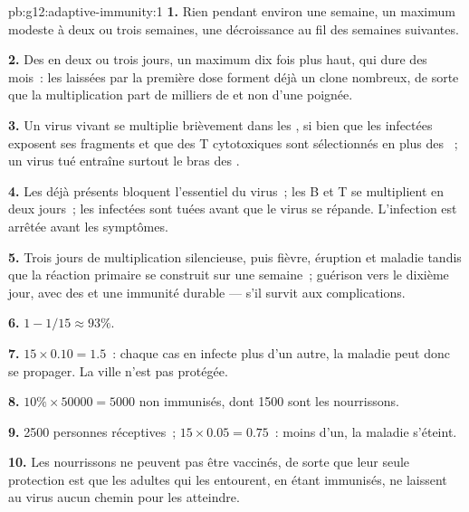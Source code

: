 \begin{solution}{pb:g12:adaptive-immunity:1}
\textbf{1.} Rien pendant environ une semaine, un maximum modeste à
deux ou trois semaines, une décroissance au fil des semaines
suivantes.

\textbf{2.} Des  en deux ou trois jours, un maximum dix fois
plus haut, qui dure des mois~: les  laissées par la
première dose forment déjà un clone nombreux, de sorte que la
multiplication part de milliers de  et non d'une poignée.

\textbf{3.} Un virus vivant se multiplie brièvement dans les ,
si bien que les  infectées exposent ses fragments et que des
 T cytotoxiques sont sélectionnés en plus des ~;
un virus tué entraîne surtout le bras des .

\textbf{4.} Les  déjà présents bloquent l'essentiel du
virus~; les  B et T se multiplient en deux jours~; les
 infectées sont tuées avant que le virus se répande.
L'infection est arrêtée avant les symptômes.

\textbf{5.} Trois jours de multiplication silencieuse, puis fièvre,
éruption et maladie tandis que la réaction primaire se construit sur
une semaine~; guérison vers le dixième jour, avec des 
et une immunité durable --- s'il survit aux complications.

\textbf{6.} $1 - 1/15 \approx 93\%$.

\textbf{7.} $15 \times 0.10 = 1.5$~: chaque cas en infecte plus d'un
autre, la maladie peut donc se propager. La ville n'est pas protégée.

\textbf{8.} $10\% \times \num{50000} = 5000$ non immunisés, dont 1500
sont les nourrissons.

\textbf{9.} 2500 personnes réceptives~; $15 \times 0.05 = 0.75$~:
moins d'un, la maladie s'éteint.

\textbf{10.} Les nourrissons ne peuvent pas être vaccinés, de sorte
que leur seule protection est que les adultes qui les entourent, en
étant immunisés, ne laissent au virus aucun chemin pour les atteindre.


\end{solution}
